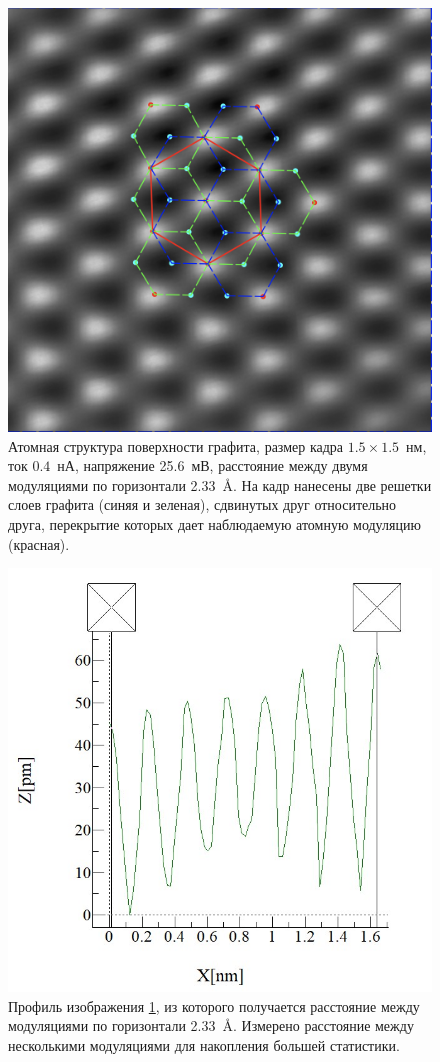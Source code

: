 \documentclass[a4paper, 12pt]{article}
\begin{document}
\begin{figure}[H]
	\centering
	\includegraphics[width=0.6\linewidth]{Crystal_structure}
	\caption{Атомная структура поверхности графита, размер кадра $1.5\times1.5$~нм, ток $0.4$~нА, напряжение 25.6~мВ, расстояние между двумя модуляциями по горизонтали 2.33~\AA. На кадр нанесены две решетки слоев графита (синяя и зеленая), сдвинутых друг относительно друга, перекрытие которых дает наблюдаемую атомную модуляцию (красная).}
	\label{fig:2_atomic}
\end{figure}

\begin{figure}[H]
	\centering
	\includegraphics[width=0.5\linewidth]{../STM_data/STM_profiles/Graphs/Crystal_structure}
	\caption{Профиль изображения \ref{fig:2_atomic}, из которого получается расстояние между модуляциями по горизонтали 2.33~\AA. Измерено расстояние между несколькими модуляциями для накопления большей статистики.}
	\label{fig:2_atomic_g}
\end{figure}
\end{document}
